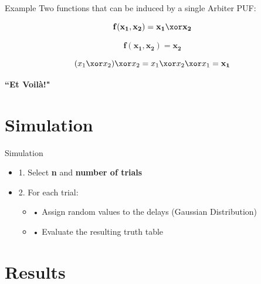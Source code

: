 \documentclass[10pt, compress]{beamer}
\begin{document}
\begin{frame}{Example}
    Two functions that can be induced by a single Arbiter PUF:

        \[\mathbf{f(x_1, x_2) = x_1 \xor x_2}\]
    
        \[\mathbf{f(x_1, x_2) = x_2}\]
        
        \vspace{0.5cm}
        
        \[(x_1 \xor x_2) \xor x_2 = x_1 \xor x_2 \xor x_1 = \mathbf{x_1}\]
        
        \vspace{1cm}
        
        \begin{center}
            \large\textbf{``Et Voilà!"}
        \end{center}
\end{frame}




\section{Simulation}

\begin{frame}{Simulation}
    
    \begin{itemize}[itemsep=0.5cm]
        \item 1. Select \textbf{n} and \textbf{number of trials}
        \item 2. For each trial:
        \begin{itemize}[itemsep=0.25cm]
            \item • Assign random values to the delays (Gaussian Distribution)
            \item • Evaluate the resulting truth table
        \end{itemize}
    \end{itemize}
\end{frame}

\section{Results}

\end{document}
